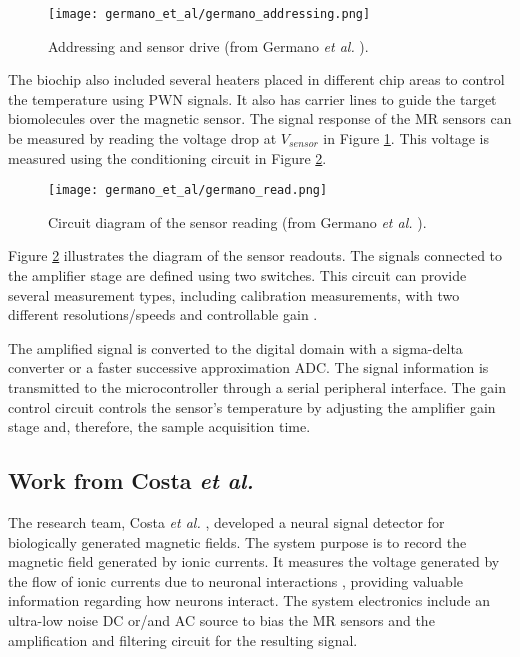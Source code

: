 \begin{figure}[!ht]
    \centering
    \texttt{[image: germano\_et\_al/germano\_addressing.png]}
    \caption{Addressing and sensor drive (from Germano \textit{et al.} \cite{Germano2006MICROSYSTEMFB}).}
    \label{figure:germano-addressing}
\end{figure}

The biochip also included several heaters placed in different chip areas to control the temperature using \ac{PWN} signals. It also has carrier lines to guide the target biomolecules over the magnetic sensor. The signal response of the \ac{MR} sensors can be measured by reading the voltage drop at $V_{sensor}$ in Figure \ref{figure:germano-addressing}. This voltage is measured using the conditioning circuit in Figure \ref{figure:germano-read}.

\begin{figure}[!ht]
    \centering
    \texttt{[image: germano\_et\_al/germano\_read.png]}
    \caption{Circuit diagram of the sensor reading (from Germano \textit{et al.} \cite{Germano2006MICROSYSTEMFB}).}
    \label{figure:germano-read}
\end{figure}

Figure \ref{figure:germano-read} illustrates the diagram of the sensor readouts. The signals connected to the amplifier stage are defined using two switches. This circuit can provide several measurement types, including calibration measurements, with two different resolutions/speeds and controllable gain \cite{Germano2006MICROSYSTEMFB}.

The amplified signal is converted to the digital domain with a sigma-delta converter or a faster successive approximation \ac{ADC}. The signal information is transmitted to the microcontroller through a serial peripheral interface. The gain control circuit controls the sensor's temperature by adjusting the amplifier gain stage and, therefore, the sample acquisition time.

\subsection{Work from Costa \textit{et al.}}

The research team, Costa \textit{et al.} \cite{TIM.2013.2296417},  developed a neural signal detector for biologically generated magnetic fields. The system purpose is to record the magnetic field generated by ionic currents. It measures the voltage generated by the flow of ionic currents due to neuronal interactions \cite{4545308}, providing valuable information regarding how neurons interact. The system electronics include an ultra-low noise \ac{DC} or/and \ac{AC} source to bias the \ac{MR} sensors and the amplification and filtering circuit for the resulting signal.

